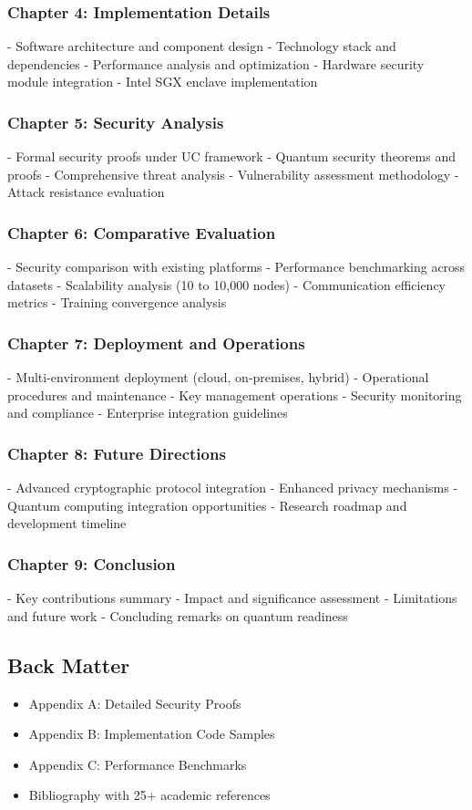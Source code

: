 \documentclass[11pt,a4paper]{article}
\begin{document}
\subsubsection{Chapter 4: Implementation Details}
- Software architecture and component design
- Technology stack and dependencies
- Performance analysis and optimization
- Hardware security module integration
- Intel SGX enclave implementation

\subsubsection{Chapter 5: Security Analysis}
- Formal security proofs under UC framework
- Quantum security theorems and proofs
- Comprehensive threat analysis
- Vulnerability assessment methodology
- Attack resistance evaluation

\subsubsection{Chapter 6: Comparative Evaluation}
- Security comparison with existing platforms
- Performance benchmarking across datasets
- Scalability analysis (10 to 10,000 nodes)
- Communication efficiency metrics
- Training convergence analysis

\subsubsection{Chapter 7: Deployment and Operations}
- Multi-environment deployment (cloud, on-premises, hybrid)
- Operational procedures and maintenance
- Key management operations
- Security monitoring and compliance
- Enterprise integration guidelines

\subsubsection{Chapter 8: Future Directions}
- Advanced cryptographic protocol integration
- Enhanced privacy mechanisms
- Quantum computing integration opportunities
- Research roadmap and development timeline

\subsubsection{Chapter 9: Conclusion}
- Key contributions summary
- Impact and significance assessment
- Limitations and future work
- Concluding remarks on quantum readiness

\subsection{Back Matter}
\begin{itemize}
\item Appendix A: Detailed Security Proofs
\item Appendix B: Implementation Code Samples
\item Appendix C: Performance Benchmarks
\item Bibliography with 25+ academic references
\end{itemize}
\end{document}
